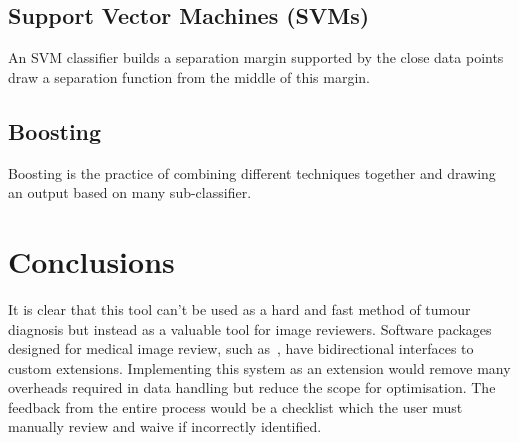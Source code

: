 \documentclass[journal]{IEEEtran}
\begin{document}
\subsection{Support Vector Machines (SVMs)}
An SVM classifier builds a separation margin supported by the close data points draw a separation function from the middle of this margin.



\subsection{Boosting}
Boosting is the practice of combining different techniques together and drawing an output based on many sub-classifier.





\section{Conclusions}
\label{sec:conclusions}

It is clear that this tool can't be used as a hard and fast method of tumour diagnosis but instead as a valuable tool for image reviewers.
Software packages designed for medical image review, such as~\cite{slicer}, have bidirectional interfaces to custom extensions.
Implementing this system as an extension would remove many overheads required in data handling but reduce the scope for optimisation.
The feedback from the entire process would be a checklist which the user must manually review and waive if incorrectly identified. 












\end{document}
